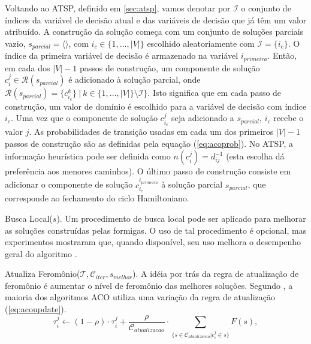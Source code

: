 Voltando ao ATSP, definido em \ref{sec:atsp}, vamos denotar por $\mathcal{I}$ o
conjunto de índices da variável de decisão atual e das variáveis de decisão que
já têm um valor atribuído. A construção da solução começa com um conjunto de
soluções parciais vazio, $s_{parcial} = \langle \rangle$, com $i_{c} \in \{1,
\ldots, |V|\}$ escolhido aleatoriamente com $\mathcal{I} = \{i_{c}\}$. O índice
da primeira variável de decisão é armazenado na variável $i_{primeira}$. Então,
em cada dos $|V|-1$ passos de construção, um componente de solução $c_{i}^{j}
\in \mathcal{R}(s_{parcial})$ é adicionado à solução parcial, onde
$\mathcal{R}(s_{parcial}) = \{c_{i_{c}}^{k}\}\ |\ k \in \{1, \ldots, |V|\}
\setminus \mathcal{I}\}$. Isto significa que em cada passo de construção, um
valor de domínio é escolhido para a variável de decisão com índice $i_{c}$. Uma
vez que o componente de solução $c_{i_{c}}^{j}$ seja adicionado a
$s_{parcial}$, $i_{c}$ recebe o valor $j$. As probabilidades de transição
usadas em cada um dos primeiros $|V|-1$ passos de construção são as definidas
pela equação (\ref{eq:acoprob}). No ATSP, a informação heurística pode ser
definida como $n(c_{i}^{j}) = d_{ij}^{-1}$ (esta escolha dá preferência aos
menores caminhos). O último passo de construção consiste em adicionar o
componente de solução $c_{i_{c}}^{i_{primeira}}$ à solução parcial
$s_{parcial}$, que corresponde ao fechamento do ciclo Hamiltoniano.

Busca Local($s$). Um procedimento de busca local pode ser aplicado para
melhorar as soluções construídas pelas formigas. O uso de tal procedimento é
opcional, mas experimentos mostraram que, quando disponível, seu uso melhora o
desempenho geral do algoritmo \cite{dorigo2005ant}.

Atualiza Feromônio($\mathcal{T}, \mathcal{C}_{iter}, s_{melhor}$). A idéia por
trás da regra de atualização de feromônio é aumentar o nível de feromônio das
melhores soluções. Segundo \cite{dorigo2005ant}, a maioria dos algoritmos ACO
utiliza uma variação da regra de atualização (\ref{eq:acoupdate}).
\begin{equation}
\label{eq:acoupdate}
\tau_{i}^{j} \gets (1 - \rho) \cdot \tau_{i}^{j} +
\frac{\rho}{\mathcal{C}_{atualizacao}} \cdot \sum_{\{s \in
\mathcal{C}_{atualizacao} | c_{i}^{j} \in s\}} F(s),
\end{equation}

